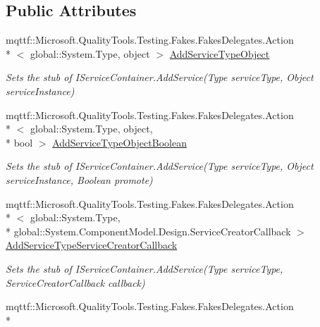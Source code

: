 \subsection*{Public Attributes}
\begin{DoxyCompactItemize}
\item 
mqttf\-::\-Microsoft.\-Quality\-Tools.\-Testing.\-Fakes.\-Fakes\-Delegates.\-Action\\*
$<$ global\-::\-System.\-Type, object $>$ \hyperlink{class_system_1_1_component_model_1_1_design_1_1_fakes_1_1_stub_i_service_container_a14caf2877563b04dfa336bdf35048f4e}{Add\-Service\-Type\-Object}
\begin{DoxyCompactList}\small\item\em Sets the stub of I\-Service\-Container.\-Add\-Service(\-Type service\-Type, Object service\-Instance)\end{DoxyCompactList}\item 
mqttf\-::\-Microsoft.\-Quality\-Tools.\-Testing.\-Fakes.\-Fakes\-Delegates.\-Action\\*
$<$ global\-::\-System.\-Type, object, \\*
bool $>$ \hyperlink{class_system_1_1_component_model_1_1_design_1_1_fakes_1_1_stub_i_service_container_ad234c01389ecd67f64ce97e854ad0123}{Add\-Service\-Type\-Object\-Boolean}
\begin{DoxyCompactList}\small\item\em Sets the stub of I\-Service\-Container.\-Add\-Service(\-Type service\-Type, Object service\-Instance, Boolean promote)\end{DoxyCompactList}\item 
mqttf\-::\-Microsoft.\-Quality\-Tools.\-Testing.\-Fakes.\-Fakes\-Delegates.\-Action\\*
$<$ global\-::\-System.\-Type, \\*
global\-::\-System.\-Component\-Model.\-Design.\-Service\-Creator\-Callback $>$ \hyperlink{class_system_1_1_component_model_1_1_design_1_1_fakes_1_1_stub_i_service_container_a112fd0835d3cb0f3e92398d5a16f16b9}{Add\-Service\-Type\-Service\-Creator\-Callback}
\begin{DoxyCompactList}\small\item\em Sets the stub of I\-Service\-Container.\-Add\-Service(\-Type service\-Type, Service\-Creator\-Callback callback)\end{DoxyCompactList}\item 
mqttf\-::\-Microsoft.\-Quality\-Tools.\-Testing.\-Fakes.\-Fakes\-Delegates.\-Action\\*

\end{DoxyCompactItemize}
